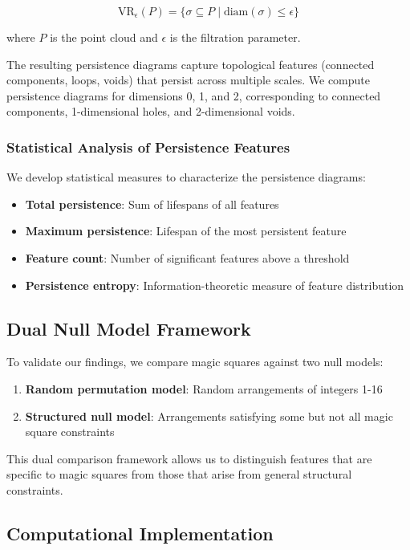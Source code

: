 \[
\text{VR}_\epsilon(P) = \{\sigma \subseteq P \mid \text{diam}(\sigma) \leq \epsilon\}
\]

where $P$ is the point cloud and $\epsilon$ is the filtration parameter.

The resulting persistence diagrams capture topological features (connected components, loops, voids) that persist across multiple scales. We compute persistence diagrams for dimensions 0, 1, and 2, corresponding to connected components, 1-dimensional holes, and 2-dimensional voids.

\subsubsection{Statistical Analysis of Persistence Features}

We develop statistical measures to characterize the persistence diagrams:

\begin{itemize}
    \item \textbf{Total persistence}: Sum of lifespans of all features
    \item \textbf{Maximum persistence}: Lifespan of the most persistent feature
    \item \textbf{Feature count}: Number of significant features above a threshold
    \item \textbf{Persistence entropy}: Information-theoretic measure of feature distribution
\end{itemize}

\subsection{Dual Null Model Framework}

To validate our findings, we compare magic squares against two null models:

\begin{enumerate}
    \item \textbf{Random permutation model}: Random arrangements of integers 1-16
    \item \textbf{Structured null model}: Arrangements satisfying some but not all magic square constraints
\end{enumerate}

This dual comparison framework allows us to distinguish features that are specific to magic squares from those that arise from general structural constraints.

\subsection{Computational Implementation}


